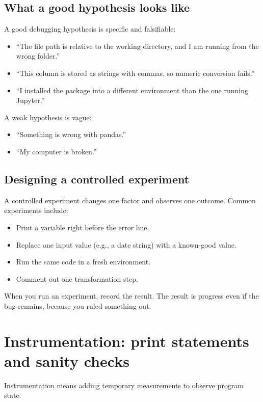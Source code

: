 \subsection{What a good hypothesis looks like}
A good debugging hypothesis is specific and falsifiable:
\begin{itemize}[noitemsep]
  \item ``The file path is relative to the working directory, and I am running from the wrong folder.''
  \item ``This column is stored as strings with commas, so numeric conversion fails.''
  \item ``I installed the package into a different environment than the one running Jupyter.''
\end{itemize}

A weak hypothesis is vague:
\begin{itemize}[noitemsep]
  \item ``Something is wrong with pandas.''
  \item ``My computer is broken.''
\end{itemize}

\subsection{Designing a controlled experiment}
A controlled experiment changes one factor and observes one outcome. Common experiments include:
\begin{itemize}[noitemsep]
  \item Print a variable right before the error line.
  \item Replace one input value (e.g., a date string) with a known-good value.
  \item Run the same code in a fresh environment.
  \item Comment out one transformation step.
\end{itemize}

When you run an experiment, record the result. The result is progress even if the bug remains, because you ruled something out.

\section{Instrumentation: print statements and sanity checks}
Instrumentation means adding temporary measurements to observe program state.

